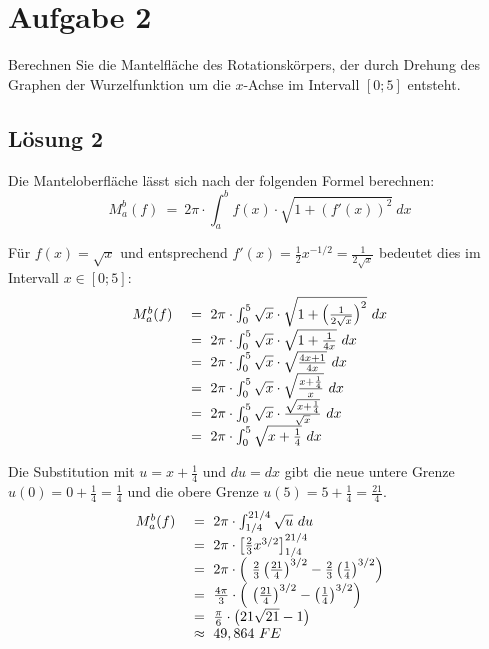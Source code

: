 \documentclass[main.tex]{subfiles}
\begin{document}
\section{Aufgabe 2}
Berechnen Sie die Mantelfläche des Rotationskörpers, der durch Drehung des Graphen der Wurzelfunktion um die $x$-Achse im Intervall $[0;5]$ entsteht.

\subsection{Lösung 2}
Die Manteloberfläche lässt sich nach der folgenden Formel berechnen:
\begin{equation*}
    M_{a}^{b}( f) \ =\ 2\pi \cdotp \int _{a}^{b} f( x) \cdotp \sqrt{1+( f'( x))^{2}} \ dx
\end{equation*}

Für $f( x) =\sqrt{x}$ und entsprechend $f'( x) =\frac{1}{2} x^{-1/2} =\frac{1}{2\sqrt{x}}$ bedeutet dies im Intervall $x\in [ 0;5]$:
\begin{equation*}
    \begin{array}{ c l }
        M_{a}^{b}( f) \  & =\ 2\pi \cdotp \int _{0}^{5}\sqrt{x} \cdotp \sqrt{1+\left(\frac{1}{2\sqrt{x}}\right)^{2}} \ dx\\
        & =\ 2\pi \cdotp \int _{0}^{5}\sqrt{x} \cdotp \sqrt{1+\frac{1}{4x}} \ dx\\
        & =\ 2\pi \cdotp \int _{0}^{5}\sqrt{x} \cdotp \sqrt{\frac{4x+1}{4x}} \ dx\\
        & =\ 2\pi \cdotp \int\nolimits _{0}^{5}\sqrt{x} \cdotp \sqrt{\frac{x+\frac{1}{4}}{x}} \ dx\\
        & =\ 2\pi \cdotp \int\nolimits _{0}^{5}\sqrt{x} \cdotp \frac{\sqrt{x+\frac{1}{4}}}{\sqrt{x}} \ dx\\
        & =\ 2\pi \cdotp \int\nolimits _{0}^{5}\sqrt{x+\frac{1}{4}} \ dx
    \end{array}
\end{equation*}

Die Substitution mit $u=x+\frac{1}{4}$ und $du=dx$ gibt die neue untere Grenze $u( 0) =0+\frac{1}{4} =\frac{1}{4}$ und die obere Grenze $u( 5) =5+\frac{1}{4} =\frac{21}{4}$. 
\begin{equation*}
    \begin{array}{ c l }
        M_{a}^{b}( f) \  & =\ 2\pi \cdotp \int\nolimits _{1/4}^{21/4}\sqrt{u} \ du\\
        & =\ 2\pi \cdotp \left[\frac{2}{3} x^{3/2}\right]_{1/4}^{21/4}\\
        & =\ 2\pi \cdotp \left( \ \frac{2}{3}\left(\frac{21}{4}\right)^{3/2} -\frac{2}{3}\left(\frac{1}{4}\right)^{3/2}\right)\\
        & =\ \frac{4\pi }{3} \cdotp \left( \ \left(\frac{21}{4}\right)^{3/2} -\left(\frac{1}{4}\right)^{3/2}\right)\\
        & =\ \frac{\pi }{6} \cdotp \left( 21\sqrt{21} -1\right)\\
        & \approx \ 49,864\ FE
    \end{array}
\end{equation*}
\end{document}
